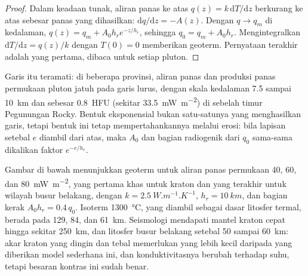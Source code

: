 \begin{proof}
Dalam keadaan tunak, aliran panas ke atas $q(z) = k\,\mathrm dT/\mathrm dz$ berkurang
ke atas sebesar panas yang dihasilkan: $\mathrm dq/\mathrm dz = -A(z)$. Dengan $q \to q_m$
di kedalaman, $q(z) = q_m + A_0h_re^{-z/h_r}$, sehingga $q_0 = q_m + A_0h_r$. Mengintegralkan
$\mathrm dT/\mathrm dz = q(z)/k$ dengan $T(0) = 0$ memberikan geoterm. Pernyataan terakhir
adalah yang pertama, dibaca untuk setiap pluton.
\end{proof}

Garis itu teramati: di beberapa provinsi, aliran panas dan produksi panas permukaan
pluton jatuh pada garis lurus, dengan skala kedalaman 7.5 sampai
\qty{10}{km} dan  sebesar \qty{0.8}{HFU} (sekitar
\qty{33.5}{mW.m^{-2}}) di sebelah timur Pegunungan Rocky. Bentuk eksponensial bukan satu-satunya
yang menghasilkan garis, tetapi bentuk ini tetap mempertahankannya melalui erosi: bila lapisan setebal $e$ diambil dari atas,
maka $A_0$ dan bagian radiogenik dari $q_0$ sama-sama dikalikan faktor $e^{-e/h_r}$.

Gambar di bawah menunjukkan geoterm untuk aliran panas permukaan 40, 60, dan
\qty{80}{mW.m^{-2}}, yang pertama khas untuk kraton dan yang terakhir untuk wilayah
busur belakang, dengan $k = \qty{2.5}{W.m^{-1}.K^{-1}}$, $h_r = \qty{10}{km}$, dan
bagian kerak $A_0h_r = 0.4\,q_0$. Isoterm \qty{1300}{\celsius}, yang diambil sebagai
dasar litosfer termal, berada pada 129, 84, dan \qty{61}{km}.
Seismologi mendapati mantel kraton cepat hingga sekitar \qty{250}{km}, dan litosfer busur
belakang setebal 50 sampai \qty{60}{km}: akar kraton yang dingin dan tebal memerlukan
 yang lebih kecil daripada yang diberikan model sederhana ini, dan
konduktivitasnya berubah terhadap suhu, tetapi besaran kontras ini sudah benar.

